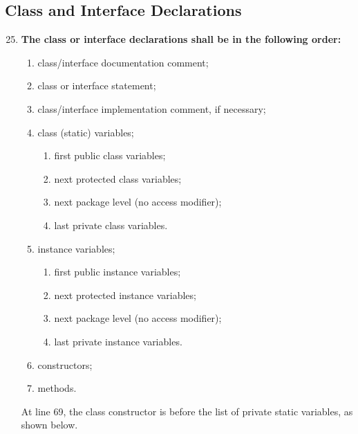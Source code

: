 \documentclass[a4paper,11pt]{report} %
\begin{document}
		
		\pagebreak
		\subsection*{Class and Interface Declarations}\begin{enumerate}[resume]
			\setcounter{enumi}{24}
			\item \textbf{The class or interface declarations shall be in the following order:}
			\begin{enumerate}
				\item class/interface documentation comment;
				\item class or interface statement;
				\item class/interface implementation comment, if necessary;
				\item class (static) variables;
				\begin{enumerate}
					\item first public class variables;
					\item next protected class variables;
					\item next package level (no access modifier);
					\item last private class variables.
				\end{enumerate}
				\item instance variables;
				\begin{enumerate}
					\item first public instance variables;
					\item next protected instance variables;
					\item next package level (no access modifier);
					\item last private instance variables.
				\end{enumerate}
				\item constructors;
				\item methods.
			\end{enumerate}\smallskip
				At line 69, the class constructor is before the list of private static variables, as shown below.

\end{enumerate}
\end{document}
